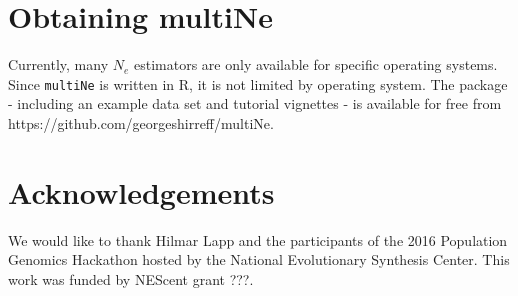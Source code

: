 \documentclass[english,titlepage]{article}
\begin{document}
\section*{Obtaining multiNe}
Currently, many $N_e$ estimators are only available for specific operating systems. Since \texttt{multiNe} is written in R, it is not limited by operating system. The package - including an example data set and tutorial vignettes - is available for free from https://github.com/georgeshirreff/multiNe. 

\section*{Acknowledgements}
We would like to thank Hilmar Lapp and the participants of the 2016 Population Genomics Hackathon hosted by the National Evolutionary Synthesis Center. This work was funded by NEScent grant ???. 





\end{document}
